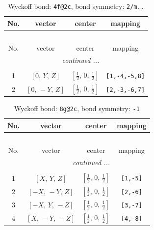 \documentclass[fleqn,8pt]{jsarticle}
\begin{document}
\begin{longtable}{cccc}
\caption{Wyckoff bond: {\tt 4f@2c}, bond symmetry: {\tt 2/m..}}
 \\
 \hline \hline
No. & vector & center & mapping \\ \hline \endfirsthead

\multicolumn{3}{l}{\tablename\ \thetable{}} \\
 \hline \hline
No. & vector & center & mapping \\ \hline \endhead

 \hline \hline
\multicolumn{3}{r}{\footnotesize\it continued ...} \\ \endfoot

 \hline \hline
\multicolumn{3}{r}{} \\ \endlastfoot

1 & $\left[ 0,\, Y,\, Z \right]$ & $\left[ \frac{1}{2},\, 0,\, \frac{1}{2} \right]$ & {\tt [1,-4,-5,8]} \\ \hline
2 & $\left[ 0,\, - Y,\, Z \right]$ & $\left[ \frac{1}{2},\, 0,\, \frac{1}{2} \right]$ & {\tt [2,-3,-6,7]} \\
\end{longtable}
\renewcommand{\arraystretch}{1.2}
\begin{longtable}{cccc}
\caption{Wyckoff bond: {\tt 8g@2c}, bond symmetry: {\tt -1}}
 \\
 \hline \hline
No. & vector & center & mapping \\ \hline \endfirsthead

\multicolumn{3}{l}{\tablename\ \thetable{}} \\
 \hline \hline
No. & vector & center & mapping \\ \hline \endhead

 \hline \hline
\multicolumn{3}{r}{\footnotesize\it continued ...} \\ \endfoot

 \hline \hline
\multicolumn{3}{r}{} \\ \endlastfoot

1 & $\left[ X,\, Y,\, Z \right]$ & $\left[ \frac{1}{2},\, 0,\, \frac{1}{2} \right]$ & {\tt [1,-5]} \\ \hline
2 & $\left[ - X,\, - Y,\, Z \right]$ & $\left[ \frac{1}{2},\, 0,\, \frac{1}{2} \right]$ & {\tt [2,-6]} \\ \hline
3 & $\left[ - X,\, Y,\, - Z \right]$ & $\left[ \frac{1}{2},\, 0,\, \frac{1}{2} \right]$ & {\tt [3,-7]} \\ \hline
4 & $\left[ X,\, - Y,\, - Z \right]$ & $\left[ \frac{1}{2},\, 0,\, \frac{1}{2} \right]$ & {\tt [4,-8]} \\
\end{longtable}
\end{document}
